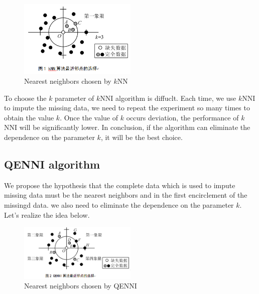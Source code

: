 \documentclass[print]{jicspack}
\begin{document}
\begin{figure}[h]
\centering
\includegraphics[angle=0, width=0.5\textwidth]{figure1.png}
\caption{Nearest neighbors chosen by $k$NN}
\label{fig:figure1}
\end{figure}

To choose the $k$ parameter of $k$NNI algorithm is diffuclt. Each time, we use $k$NNI to impute the missing data, we need to repeat the experiment so many times to obtain the value $k$. Once the value of $k$ occurs deviation, the performance of $k$NNI will be significantly lower. In conclusion, if the algorithm can eliminate the dependence on the parameter $k$, it will be the best choice.

\subsection{QENNI algorithm}
\label{2.3}
We propose the hypothesis that the complete data which is used to impute missing data must be the nearest neighbors and in the first encirclement of the missingd data. we also need to eliminate the dependence on the parameter $k$. Let's realize the idea below.

\begin{figure}[h]
\centering
\includegraphics[angle=0, width=0.5\textwidth]{figure2.png}
\caption{Nearest neighbors chosen by QENNI}
\label{fig:figure2}
\end{figure}
\end{document}
